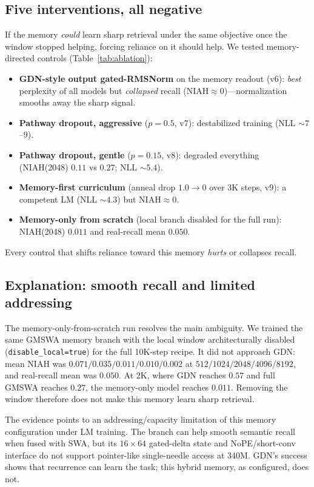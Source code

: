 \documentclass[letterpaper]{article} %
\begin{document}
\subsection{Five interventions, all negative}
If the memory \emph{could} learn sharp retrieval under the same objective once the window stopped helping, forcing reliance on it should help. We tested memory-directed controls (Table~\ref{tab:ablation}):
\begin{itemize}
\item \textbf{GDN-style output gated-RMSNorm} on the memory readout (v6): \emph{best} perplexity of all models but \emph{collapsed} recall (NIAH${\approx}0$)---normalization smooths away the sharp signal.
\item \textbf{Pathway dropout, aggressive} ($p{=}0.5$, v7): destabilized training (NLL ${\sim}7$--$9$).
\item \textbf{Pathway dropout, gentle} ($p{=}0.15$, v8): degraded everything (NIAH(2048) $0.11$ vs $0.27$; NLL ${\sim}5.4$).
\item \textbf{Memory-first curriculum} (anneal drop $1.0{\to}0$ over 3K steps, v9): a competent LM (NLL ${\sim}4.3$) but NIAH${\approx}0$.
\item \textbf{Memory-only from scratch} (local branch disabled for the full run): NIAH(2048) $0.011$ and real-recall mean $0.050$.
\end{itemize}
Every control that shifts reliance toward this memory \emph{hurts} or collapses recall.

\subsection{Explanation: smooth recall and limited addressing}
The memory-only-from-scratch run resolves the main ambiguity. We trained the same GMSWA memory branch with the local window architecturally disabled (\texttt{disable\_local=true}) for the full 10K-step recipe. It did not approach GDN: mean NIAH was $0.071/0.035/0.011/0.010/0.002$ at $512/1024/2048/4096/8192$, and real-recall mean was $0.050$. At 2K, where GDN reaches $0.57$ and full GMSWA reaches $0.27$, the memory-only model reaches $0.011$. Removing the window therefore does not make this memory learn sharp retrieval.

The evidence points to an addressing/capacity limitation of this memory configuration under LM training. The branch can help smooth semantic recall when fused with SWA, but its $16\times64$ gated-delta state and NoPE/short-conv interface do not support pointer-like single-needle access at 340M. GDN's success shows that recurrence can learn the task; this hybrid memory, as configured, does not.
\end{document}
